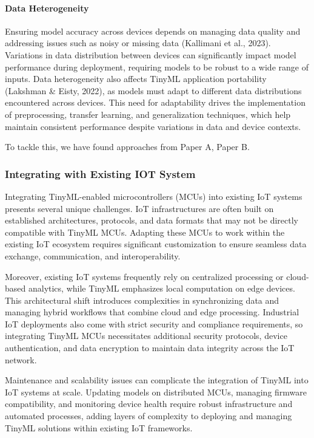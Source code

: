 \documentclass[twocolumn]{article}
\begin{document}
\paragraph{Data Heterogeneity} Ensuring model accuracy across devices depends on managing data quality and addressing issues such as noisy or missing data (Kallimani et al., 2023). Variations in data distribution between devices can significantly impact model performance during deployment, requiring models to be robust to a wide range of inputs. Data heterogeneity also affects TinyML application portability (Lakshman \& Eisty, 2022), as models must adapt to different data distributions encountered across devices. This need for adaptability drives the implementation of preprocessing, transfer learning, and generalization techniques, which help maintain consistent performance despite variations in data and device contexts.

To tackle this, we have found approaches from Paper A, Paper B.



\subsubsection{Integrating with Existing IOT System}
Integrating TinyML-enabled microcontrollers (MCUs) into existing IoT systems presents several unique challenges. IoT infrastructures are often built on established architectures, protocols, and data formats that may not be directly compatible with TinyML MCUs. Adapting these MCUs to work within the existing IoT ecosystem requires significant customization to ensure seamless data exchange, communication, and interoperability.

Moreover, existing IoT systems frequently rely on centralized processing or cloud-based analytics, while TinyML emphasizes local computation on edge devices. This architectural shift introduces complexities in synchronizing data and managing hybrid workflows that combine cloud and edge processing. Industrial IoT deployments also come with strict security and compliance requirements, so integrating TinyML MCUs necessitates additional security protocols, device authentication, and data encryption to maintain data integrity across the IoT network.

Maintenance and scalability issues can complicate the integration of TinyML into IoT systems at scale. Updating models on distributed MCUs, managing firmware compatibility, and monitoring device health require robust infrastructure and automated processes, adding layers of complexity to deploying and managing TinyML solutions within existing IoT frameworks.
\end{document}
